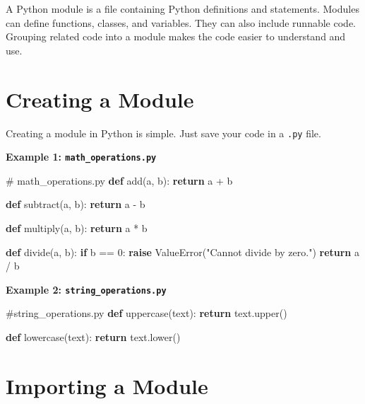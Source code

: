 \documentclass[
  letterpaper,
  DIV=11,
  numbers=noendperiod]{scrreprt}
\newenvironment{Shaded}{\begin{snugshade}}{\end{snugshade}}
\newcommand{\CommentTok}[1]{\textcolor[rgb]{0.37,0.37,0.37}{#1}}
\newcommand{\ControlFlowTok}[1]{\textcolor[rgb]{0.00,0.23,0.31}{\textbf{#1}}}
\newcommand{\DecValTok}[1]{\textcolor[rgb]{0.68,0.00,0.00}{#1}}
\newcommand{\KeywordTok}[1]{\textcolor[rgb]{0.00,0.23,0.31}{\textbf{#1}}}
\newcommand{\NormalTok}[1]{\textcolor[rgb]{0.00,0.23,0.31}{#1}}
\newcommand{\OperatorTok}[1]{\textcolor[rgb]{0.37,0.37,0.37}{#1}}
\newcommand{\PreprocessorTok}[1]{\textcolor[rgb]{0.68,0.00,0.00}{#1}}
\newcommand{\StringTok}[1]{\textcolor[rgb]{0.13,0.47,0.30}{#1}}
\begin{document}
A Python module is a file containing Python definitions and statements.
Modules can define functions, classes, and variables. They can also
include runnable code. Grouping related code into a module makes the
code easier to understand and use.

\section{Creating a Module}\label{creating-a-module}

Creating a module in Python is simple. Just save your code in a
\texttt{.py} file.

\textbf{Example 1: \texttt{math\_operations.py}}

\begin{Shaded}
\begin{Highlighting}[]
\CommentTok{\# math\_operations.py    }
\KeywordTok{def}\NormalTok{ add(a, b):}
    \ControlFlowTok{return}\NormalTok{ a }\OperatorTok{+}\NormalTok{ b}

\KeywordTok{def}\NormalTok{ subtract(a, b):}
    \ControlFlowTok{return}\NormalTok{ a }\OperatorTok{{-}}\NormalTok{ b}

\KeywordTok{def}\NormalTok{ multiply(a, b):}
    \ControlFlowTok{return}\NormalTok{ a }\OperatorTok{*}\NormalTok{ b}

\KeywordTok{def}\NormalTok{ divide(a, b):}
    \ControlFlowTok{if}\NormalTok{ b }\OperatorTok{==} \DecValTok{0}\NormalTok{:}
        \ControlFlowTok{raise} \PreprocessorTok{ValueError}\NormalTok{(}\StringTok{"Cannot divide by zero."}\NormalTok{)}
    \ControlFlowTok{return}\NormalTok{ a }\OperatorTok{/}\NormalTok{ b}
\end{Highlighting}
\end{Shaded}

\textbf{Example 2: \texttt{string\_operations.py}}

\begin{Shaded}
\begin{Highlighting}[]
\CommentTok{\#string\_operations.py}
\KeywordTok{def}\NormalTok{ uppercase(text):}
    \ControlFlowTok{return}\NormalTok{ text.upper()}

\KeywordTok{def}\NormalTok{ lowercase(text):}
    \ControlFlowTok{return}\NormalTok{ text.lower()}
\end{Highlighting}
\end{Shaded}

\section{Importing a Module}\label{importing-a-module}
\end{document}
